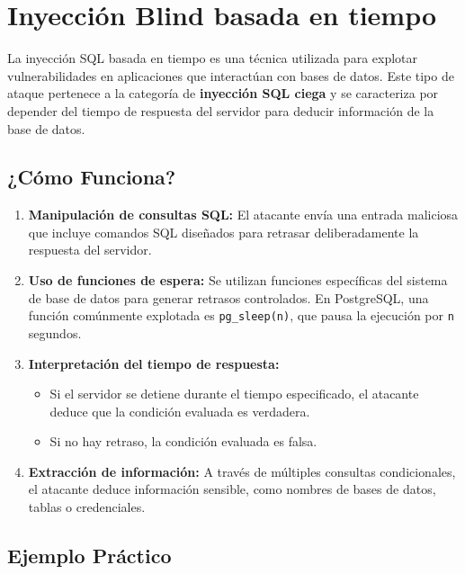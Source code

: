 \documentclass[a4paper,12pt]{article}
\begin{document}
\section{Inyección Blind basada en tiempo}


La inyección SQL basada en tiempo es una técnica utilizada para explotar vulnerabilidades en aplicaciones que interactúan con bases de datos. Este tipo de ataque pertenece a la categoría de \textbf{inyección SQL ciega} y se caracteriza por depender del tiempo de respuesta del servidor para deducir información de la base de datos.

\subsection{¿Cómo Funciona?}

\begin{enumerate}
    \item \textbf{Manipulación de consultas SQL:}  
    El atacante envía una entrada maliciosa que incluye comandos SQL diseñados para retrasar deliberadamente la respuesta del servidor.

    \item \textbf{Uso de funciones de espera:}  
    Se utilizan funciones específicas del sistema de base de datos para generar retrasos controlados. En PostgreSQL, una función comúnmente explotada es \texttt{pg\_sleep(n)}, que pausa la ejecución por \texttt{n} segundos.

    \item \textbf{Interpretación del tiempo de respuesta:}  
    \begin{itemize}
        \item Si el servidor se detiene durante el tiempo especificado, el atacante deduce que la condición evaluada es verdadera.
        \item Si no hay retraso, la condición evaluada es falsa.
    \end{itemize}

    \item \textbf{Extracción de información:}  
    A través de múltiples consultas condicionales, el atacante deduce información sensible, como nombres de bases de datos, tablas o credenciales.
\end{enumerate}

\subsection{Ejemplo Práctico}
\end{document}
